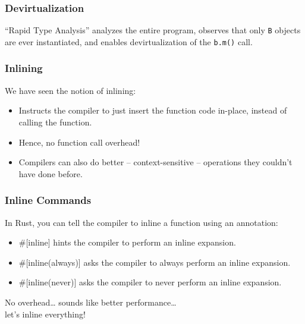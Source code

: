 \begin{frame}
\frametitle{Devirtualization}

``Rapid Type Analysis'' analyzes the entire program, observes that
only {\tt B} objects are ever instantiated, and enables devirtualization
of the {\tt b.m()} call.

\end{frame}

\begin{frame}
  \frametitle{Inlining}

  

  We have seen the notion of inlining:
  \begin{itemize}
    \item Instructs the compiler to just insert the function code in-place,
      instead of calling the function.
    \item Hence, no function call overhead!
    \item Compilers can also do better -- context-sensitive -- operations they couldn't
      have done before.
  \end{itemize}
  \vfill
\end{frame}

\begin{frame}
\frametitle{Inline Commands}

In Rust, you can tell the compiler to inline a function using an annotation:
\begin{itemize}
 \item \#[inline] hints the compiler to perform an inline expansion.
 \item \#[inline(always)] asks the compiler to always perform an inline expansion.
 \item \#[inline(never)] asks the compiler to never perform an inline expansion.
\end{itemize}

  
  No overhead\ldots{} sounds like better performance\ldots{} \\let's inline everything!
  
\end{frame}

